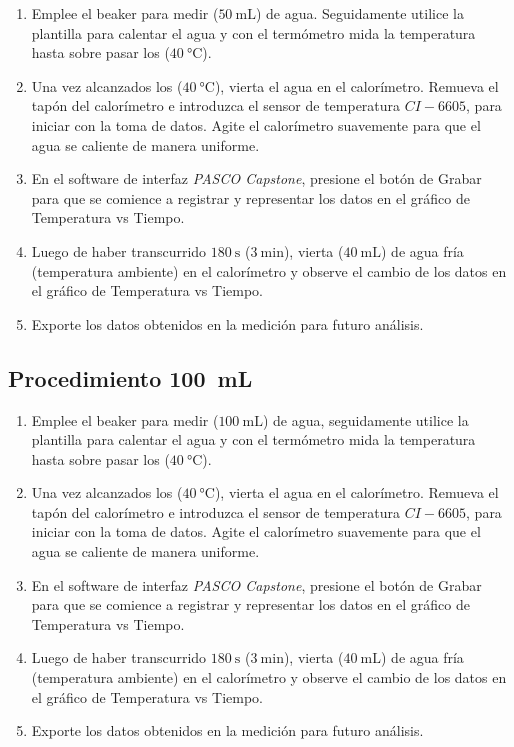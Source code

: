 \documentclass[12pt,letterpaper]{report}
\begin{document}
\begin{enumerate}
    \item Emplee el beaker para medir ($\SI{50}{\milli\liter}$) de agua. Seguidamente utilice la  plantilla para calentar el agua y con el termómetro mida la temperatura hasta sobre pasar los ($\SI{40}{\celsius}$).
    \item Una vez alcanzados los ($\SI{40}{\celsius}$), vierta el agua en el calorímetro. Remueva el tapón del calorímetro e introduzca el sensor de temperatura $CI-6605$, para iniciar con la toma de datos. Agite el calorímetro suavemente para que el agua se caliente de manera uniforme.
    \item En el software de interfaz \textit{PASCO Capstone}, presione el botón de Grabar para que se comience a registrar y representar los datos en el gráfico de Temperatura vs Tiempo. 
    \item Luego de haber transcurrido $\SI{180}{\second}$ ($\SI{3}{\minute}$), vierta ($\SI{40}{\milli\liter}$)  de agua fría (temperatura ambiente) en el calorímetro y observe el cambio de los datos en el gráfico de Temperatura vs Tiempo.
    \item Exporte los datos obtenidos en la medición para futuro análisis.
\end{enumerate}

\subsection{Procedimiento \SI{100}{\milli\liter}}
\begin{enumerate}
    \item Emplee el beaker para medir ($\SI{100}{\milli\liter}$) de agua, seguidamente utilice la  plantilla para calentar el agua y con el termómetro mida la temperatura hasta sobre pasar los ($\SI{40}{\celsius}$).
    \item Una vez alcanzados los ($\SI{40}{\celsius}$), vierta el agua en el calorímetro. Remueva el tapón del calorímetro e introduzca el sensor de temperatura $CI-6605$, para iniciar con la toma de datos. Agite el calorímetro suavemente para que el agua se caliente de manera uniforme.
    \item En el software de interfaz \textit{PASCO Capstone}, presione el botón de Grabar para que se comience a registrar y representar los datos en el gráfico de Temperatura vs Tiempo. 
    \item Luego de haber transcurrido $\SI{180}{\second}$ ($\SI{3}{\minute}$), vierta ($\SI{40}{\milli\liter}$) de agua fría (temperatura ambiente) en el calorímetro y observe el cambio de los datos en el gráfico de Temperatura vs Tiempo.
    \item Exporte los datos obtenidos en la medición para futuro análisis.
\end{enumerate}
\end{document}
